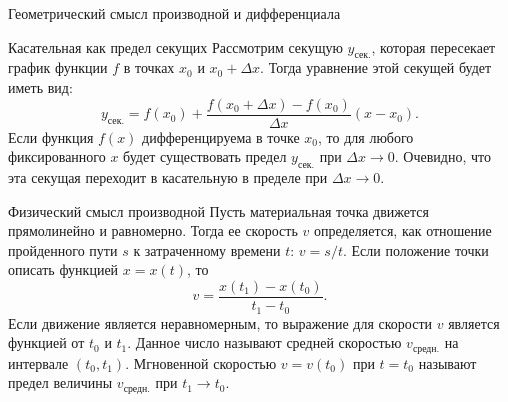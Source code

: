\documentclass[8pt]{beamer}
\begin{document}

\begin{frame}{Геометрический смысл производной и дифференциала}
\begin{block}{Касательная как предел секущих}
Рассмотрим секущую $y_{\text{сек.}}$, которая пересекает график функции $f$ в точках $x_0$ и $x_0+\Delta x$. Тогда уравнение этой секущей будет иметь вид:
$$y_{\text{сек.}}=f(x_0)+\frac{f(x_0+\Delta x)-f(x_0)}{\Delta x}(x-x_0).$$
Если функция $f(x)$ дифференцируема в точке $x_0$, то для любого фиксированного $x$ будет существовать предел $y_{\text{сек.}}$ при $\Delta x\to0$. Очевидно, что эта секущая переходит в касательную в пределе при $\Delta x\to0$.
\end{block}
\begin{block}{Физический смысл производной}
Пусть материальная точка движется прямолинейно и равномерно. Тогда ее скорость $v$ определяется, как отношение пройденного пути $s$ к затраченному времени $t$: $v = s/t$.
Если положение точки описать функцией $x=x(t)$, то
$$v=\frac{x(t_1)-x(t_0)}{t_1-t_0}.$$
Если движение является неравномерным, то выражение для скорости $v$ является функцией от $t_0$ и $t_1$. Данное число называют средней скоростью $v_{\text{средн.}}$ на интервале $(t_0,t_1)$. Мгновенной скоростью $v=v(t_0)$ при $t=t_0$ называют предел величины $v_{\text{средн.}}$ при $t_1\to t_0$.
\end{block}
\end{frame}
\end{document}
